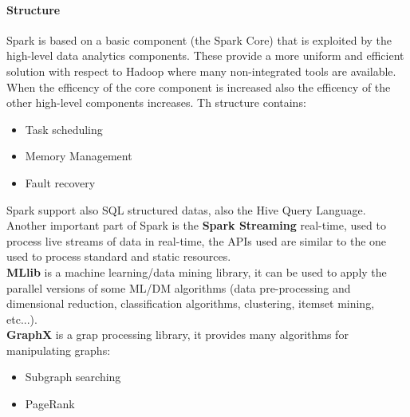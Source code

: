 \documentclass[12pt]{article}
\begin{document}
\paragraph{Structure} Spark is based on a basic component (the Spark Core) that is exploited by the high-level data analytics components. These provide a more uniform and efficient solution with respect to Hadoop where many non-integrated tools are available. When the efficency of the core component is increased also the efficency of the other high-level components increases.
Th structure contains:
\begin{itemize}
  \item Task scheduling
  \item Memory Management
  \item Fault recovery
\end{itemize}
Spark support also SQL structured datas, also the Hive Query Language.\\
Another important part of Spark is the \textbf{Spark Streaming} real-time, used to process live streams of data in real-time, the APIs used are similar to the one used to process standard and static resources.\\
\textbf{MLlib} is a machine learning/data mining library, it can be used to apply the parallel versions of some ML/DM algorithms (data pre-processing and dimensional reduction, classification algorithms, clustering, itemset mining, etc...).\\
\textbf{GraphX} is a grap processing library, it provides many algorithms for manipulating graphs:
\begin{itemize}
  \item Subgraph searching
  \item PageRank
\end{itemize}
\end{document}
